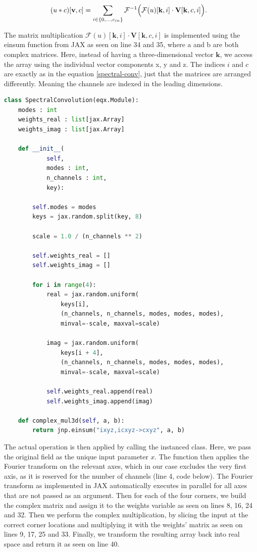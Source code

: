 \documentclass{article}
\begin{document}
{\begin{equation}
\label{spectral-conv}
    (u \ast c)[\mathbf{v}, c] = \sum_{i \in \{0, \dots, c_{in}\}} \mathcal{F}^{-1}\Bigl(\mathcal{F}(u)[\mathbf{k}, i] \cdot \mathbf{V}[\mathbf{k}, c, i] \Bigr).
\end{equation}

The matrix multiplication $\mathcal{F}(u)[\mathbf{k}, i] \cdot \mathbf{V}[\mathbf{k}, c, i]$ is implemented using the {einsum} function from {JAX} as seen on line 34 and 35, where a and b are both complex matrices. Here, instead of having a three-dimensional vector $\mathbf{k}$, we access the array using the individual vector components x, y and z. The indices $i$ and $c$ are exactly as in the equation \ref{spectral-conv}, just that the matrices are arranged differently. Meaning the channels are indexed in the leading dimensions. 


\begin{lstlisting}[language=Python]
class SpectralConvolution(eqx.Module):
    modes : int
    weights_real : list[jax.Array]
    weights_imag : list[jax.Array]

    def __init__(
            self, 
            modes : int,
            n_channels : int,
            key):
        
        self.modes = modes
        keys = jax.random.split(key, 8)
        
        scale = 1.0 / (n_channels ** 2)

        self.weights_real = []
        self.weights_imag = []

        for i in range(4):
            real = jax.random.uniform(
                keys[i], 
                (n_channels, n_channels, modes, modes, modes),
                minval=-scale, maxval=scale)
            
            imag = jax.random.uniform(
                keys[i + 4], 
                (n_channels, n_channels, modes, modes, modes),
                minval=-scale, maxval=scale)
            
            self.weights_real.append(real)
            self.weights_imag.append(imag)
        
    def complex_mul3d(self, a, b):
        return jnp.einsum("ixyz,icxyz->cxyz", a, b)
\end{lstlisting}

The actual operation is then applied by calling the instanced class. Here, we pass the original field as the unique input parameter $x$. The function then applies the Fourier transform on the relevant axes, which in our case excludes the very first axis, as it is reserved for the number of channels (line 4, code below). The Fourier transform as implemented in {JAX} automatically executes in parallel for all axes that are not passed as an argument.  Then for each of the four corners, we build the complex matrix and assign it to the weights variable as seen on lines 8, 16, 24 and 32. Then we perform the complex multiplication, by slicing the input at the correct corner locations and multiplying it with the weights' matrix as seen on lines 9, 17, 25 and 33. Finally, we transform the resulting array back into real space and return it as seen on line 40.

}
\end{document}
